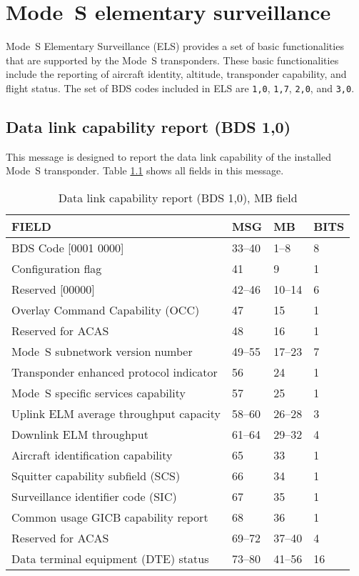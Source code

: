 \chapter{Mode~S elementary surveillance}

Mode~S Elementary Surveillance (ELS) provides a set of basic functionalities that are supported by the Mode~S transponders. These basic functionalities include the reporting  of aircraft identity, altitude, transponder capability, and flight status. The set of BDS codes included in ELS are \texttt{1,0}, \texttt{1,7}, \texttt{2,0}, and \texttt{3,0}.

\section{Data link capability report (BDS 1,0)}

This message is designed to report the data link capability of the installed Mode~S transponder. Table \ref{tb:bds10} shows all fields in this message.

\begin{table}[ht]
\centering
\caption{Data link capability report (BDS 1,0), MB field}
\label{tb:bds10}
\begin{tabular}{|l|l|l|l|}
\hline
\textbf{FIELD} & \textbf{MSG} & \textbf{MB} & \textbf{BITS} \\ \hline
BDS Code {[}0001 0000{]} & 33--40 & 1--8 & 8 \\ \hline
Configuration flag & 41 & 9 & 1 \\ \hline
Reserved {[}00000{]} & 42--46 & 10--14 & 6 \\ \hline
Overlay Command Capability (OCC) & 47 & 15 & 1 \\ \hline
Reserved for ACAS & 48 & 16 & 1 \\ \hline
Mode~S subnetwork version number & 49--55 & 17--23 & 7 \\ \hline
Transponder enhanced protocol indicator & 56 & 24 & 1 \\ \hline
Mode~S specific services capability & 57 & 25 & 1 \\ \hline
Uplink ELM average throughput capacity & 58--60 & 26--28 & 3 \\ \hline
Downlink ELM throughput & 61--64 & 29--32 & 4 \\ \hline
Aircraft identification capability & 65 & 33 & 1 \\ \hline
Squitter capability subfield (SCS) & 66 & 34 & 1 \\ \hline
Surveillance identifier code (SIC) & 67 & 35 & 1 \\ \hline
Common usage GICB capability report & 68 & 36 & 1 \\ \hline
Reserved for ACAS & 69--72 & 37--40 & 4 \\ \hline
Data terminal equipment (DTE) status & 73--80 & 41--56 & 16 \\ \hline
\end{tabular}
\end{table}



